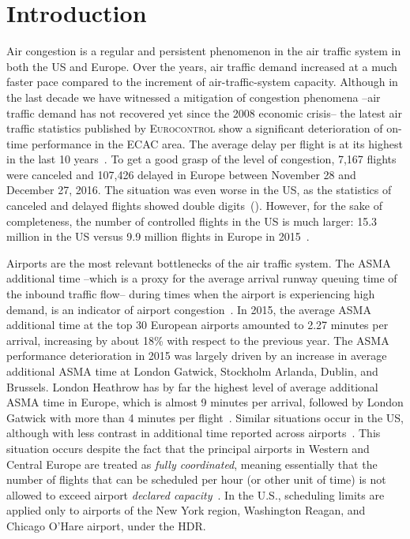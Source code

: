 \documentclass[draft,review]{elsarticle}
\begin{document}

\section{Introduction}
\label{sec:introduction}

Air congestion is a regular and persistent phenomenon in the air traffic system in both the US and Europe.
Over the years, air traffic demand increased at a much faster pace compared to the increment of air-traffic-system capacity.
Although in the last decade we have witnessed a mitigation of congestion phenomena --air traffic demand has not recovered yet since the 2008 economic crisis-- the latest air traffic statistics published by \textsc{Eurocontrol} show a significant deterioration of on-time performance in the \acl{ECAC} area.
The average delay per flight is at its highest in the last 10 years~\citep{coda2016}.
To get a good grasp of the level of congestion, 7,167 flights were canceled and 107,426  delayed in Europe between November 28 and December 27, 2016.
The situation was even worse in the US, as the statistics of canceled and delayed flights showed double digits~(\citeauthor{flightstats}).
However, for the sake of completeness, the number of controlled flights in the US is much larger: 15.3 million  in the US versus 9.9 million flights in Europe in 2015~\citep{EUCTRL-FAA2015}.

Airports are the most relevant bottlenecks of the air traffic system. The \ac{ASMA} additional time --which is a proxy for the average arrival runway queuing time of the inbound traffic flow-- during times when the airport is experiencing high demand, is an indicator of airport congestion~\citep{ASMA-def}. In 2015, the average \acs{ASMA} additional time at the top 30 European airports amounted to  2.27 minutes per arrival, increasing by about 18\% with respect to the previous year.
The \ac{ASMA} performance deterioration in 2015 was largely driven by an increase in average additional \ac{ASMA} time at London Gatwick, Stockholm Arlanda, Dublin, and Brussels.
London Heathrow has by far the highest level of average additional \ac{ASMA} time in Europe, which is almost 9 minutes per arrival, followed by London Gatwick with more than 4 minutes per flight~\citep{PRR2015}.
Similar situations occur in the US, although with less contrast in additional time reported across airports~\citep{EUCTRL-FAA2015}.
This situation occurs despite the fact that the principal airports in Western and Central Europe are treated as \emph{fully coordinated}, meaning essentially that the number of flights that can be scheduled per hour (or other unit of time) is not allowed to exceed airport \emph{declared capacity}~\citep{deNO2003}.
In the U.S., scheduling limits are applied only to airports of the New York region, Washington Reagan, and Chicago O'Hare airport, under the \acl{HDR}.
\end{document}
